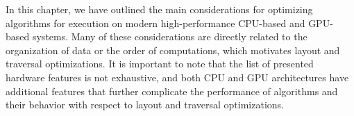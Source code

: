 In this chapter, we have outlined the main considerations for optimizing algorithms for execution on modern high-performance CPU-based and GPU-based systems. Many of these considerations are directly related to the organization of data or the order of computations, which motivates layout and traversal optimizations. It is important to note that the list of presented hardware features is not exhaustive, and both CPU and GPU architectures have additional features that further complicate the performance of algorithms and their behavior with respect to layout and traversal optimizations.
